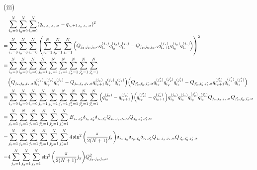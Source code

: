 \documentclass[a4paper,dvipdfmx]{jsarticle}
\theoremstyle{definition}
\begin{document}
(iii)
\begin{align}
    & \sum_{i_x=0}^{N}\sum_{i_y=0}^{N}\sum_{i_z=0}^{N}(q_{i_x,i_y,i_z,\alpha} - q_{i_x+1,i_y,i_z,\alpha})^2                                                                                                                                                                                                                                                \\
  = & \sum_{i_x=0}^{N}\sum_{i_y=0}^{N}\sum_{i_z=0}^{N}\qty(\sum_{j_x=1}^{N}\sum_{j_y=1}^{N}\sum_{j_z=1}^{N}\qty(Q_{j_x,j_y,j_z,\alpha}q_{i_x}^{(j_x)}q_{i_y}^{(j_y)}q_{i_z}^{(j_z)} - Q_{j_x,j_y,j_z,\alpha}q_{i_x+1}^{(j_x)}q_{i_y}^{(j_y)}q_{i_z}^{(j_z)}))^2                                                                                            \\
  = & \sum_{i_x=0}^{N}\sum_{i_y=0}^{N}\sum_{i_z=0}^{N}\sum_{j_x=1}^{N}\sum_{j_y=1}^{N}\sum_{j_z=1}^{N}\sum_{j_x'=1}^{N}\sum_{j_y'=1}^{N}\sum_{j_z'=1}^{N}                                                                                                                                                                                                  \\
    & \qty(Q_{j_x,j_y,j_z,\alpha}q_{i_x}^{(j_x)}q_{i_y}^{(j_y)}q_{i_z}^{(j_z)} - Q_{j_x,j_y,j_z,\alpha}q_{i_x+1}^{(j_x)}q_{i_y}^{(j_y)}q_{i_z}^{(j_z)})\qty(Q_{j_x',j_y',j_z',\alpha}q_{i_x}^{(j_x')}q_{i_y}^{(j_y')}q_{i_z}^{(j_z')} - Q_{j_x',j_y',j_z',\alpha}q_{i_x+1}^{(j_x')}q_{i_y}^{(j_y')}q_{i_z}^{(j_z')})                                       \\
  = & \sum_{i_x=0}^{N}\sum_{i_y=0}^{N}\sum_{i_z=0}^{N}\sum_{j_x=1}^{N}\sum_{j_y=1}^{N}\sum_{j_z=1}^{N}\sum_{j_x'=1}^{N}\sum_{j_y'=1}^{N}\sum_{j_z'=1}^{N}\qty(q_{i_x}^{(j_x)} - q_{i_x+1}^{(j_x)})\qty(q_{i_x}^{(j_x')} - q_{i_x+1}^{(j_x')})q_{i_y}^{(j_y)}q_{i_z}^{(j_z)}q_{i_y}^{(j_y')}q_{i_z}^{(j_z')}Q_{j_x,j_y,j_z,\alpha}Q_{j_x',j_y',j_z',\alpha} \\
  = & \sum_{j_x=1}^{N}\sum_{j_y=1}^{N}\sum_{j_z=1}^{N}\sum_{j_x'=1}^{N}\sum_{j_y'=1}^{N}\sum_{j_z'=1}^{N}B_{j_x,j_x'}\delta_{j_y,j_y'}\delta_{j_z,j_z'}Q_{j_x,j_y,j_z,\alpha}Q_{j_x',j_y',j_z',\alpha}                                                                                                                                                     \\
  = & \sum_{j_x=1}^{N}\sum_{j_y=1}^{N}\sum_{j_z=1}^{N}\sum_{j_x'=1}^{N}\sum_{j_y'=1}^{N}\sum_{j_z'=1}^{N}4\sin^2\qty(\frac{\pi}{2(N+1)}j_x)\delta_{j_x,j_x'}\delta_{j_y,j_y'}\delta_{j_z,j_z'}Q_{j_x,j_y,j_z,\alpha}Q_{j_x',j_y',j_z',\alpha}                                                                                                              \\
  = & 4\sum_{j_x=1}^{N}\sum_{j_y=1}^{N}\sum_{j_z=1}^{N}\sin^2\qty(\frac{\pi}{2(N+1)}j_x)Q_{j_x,j_y,j_z,\alpha}^2
\end{align}
\end{document}

